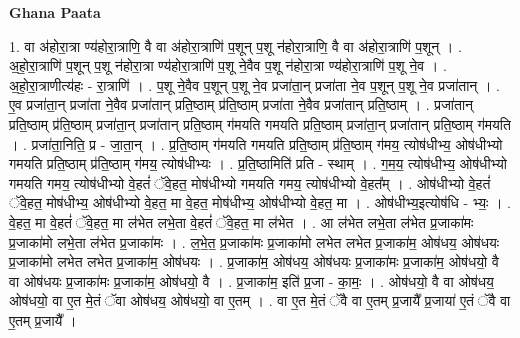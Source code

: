\documentclass[17pt]{extarticle}
\begin{document}
\textbf{Ghana Paata } \newline

1. वा अ॑होरा॒त्रा ण्य॑होरा॒त्राणि॒ वै वा अ॑होरा॒त्राणि॑ प॒शून् प॒शू न॑होरा॒त्राणि॒ वै वा अ॑होरा॒त्राणि॑ प॒शून् । . अ॒हो॒रा॒त्राणि॑ प॒शून् प॒शू न॑होरा॒त्रा ण्य॑होरा॒त्राणि॑ प॒शू ने॒वैव प॒शू न॑होरा॒त्रा ण्य॑होरा॒त्राणि॑ प॒शू ने॒व । . अ॒हो॒रा॒त्राणीत्य॑हः - रा॒त्राणि॑ । . प॒शू ने॒वैव प॒शून् प॒शू ने॒व प्रजा॑ता॒न् प्रजा॑ता ने॒व प॒शून् प॒शू ने॒व प्रजा॑तान् । . ए॒व प्रजा॑ता॒न् प्रजा॑ता ने॒वैव प्रजा॑तान् प्रति॒ष्ठाम् प्र॑ति॒ष्ठाम् प्रजा॑ता ने॒वैव प्रजा॑तान् प्रति॒ष्ठाम् । . प्रजा॑तान् प्रति॒ष्ठाम् प्र॑ति॒ष्ठाम् प्रजा॑ता॒न् प्रजा॑तान् प्रति॒ष्ठाम् ग॑मयति गमयति प्रति॒ष्ठाम् प्रजा॑ता॒न् प्रजा॑तान् प्रति॒ष्ठाम् ग॑मयति । . प्रजा॑ता॒निति॒ प्र - जा॒ता॒न् । . प्र॒ति॒ष्ठाम् ग॑मयति गमयति प्रति॒ष्ठाम् प्र॑ति॒ष्ठाम् ग॑मय॒ त्योष॑धीभ्य॒ ओष॑धीभ्यो गमयति प्रति॒ष्ठाम् प्र॑ति॒ष्ठाम् ग॑मय॒ त्योष॑धीभ्यः । . प्र॒ति॒ष्ठामिति॑ प्रति - स्थाम् । . ग॒म॒य॒ त्योष॑धीभ्य॒ ओष॑धीभ्यो गमयति गमय॒ त्योष॑धीभ्यो वे॒हतं॑ ॅवे॒हत॒ मोष॑धीभ्यो गमयति गमय॒ त्योष॑धीभ्यो वे॒हत᳚म् । . ओष॑धीभ्यो वे॒हतं॑ ॅवे॒हत॒ मोष॑धीभ्य॒ ओष॑धीभ्यो वे॒हत॒ मा वे॒हत॒ मोष॑धीभ्य॒ ओष॑धीभ्यो वे॒हत॒ मा । . ओष॑धीभ्य॒इत्योष॑धि - भ्यः॒ । . वे॒हत॒ मा वे॒हतं॑ ॅवे॒हत॒ मा ल॑भेत लभे॒ता वे॒हतं॑ ॅवे॒हत॒ मा ल॑भेत । . आ ल॑भेत लभे॒ता ल॑भेत प्र॒जाका॑मः प्र॒जाका॑मो लभे॒ता ल॑भेत प्र॒जाका॑मः । . ल॒भे॒त॒ प्र॒जाका॑मः प्र॒जाका॑मो लभेत लभेत प्र॒जाका॑म॒ ओष॑धय॒ ओष॑धयः प्र॒जाका॑मो लभेत लभेत प्र॒जाका॑म॒ ओष॑धयः । . प्र॒जाका॑म॒ ओष॑धय॒ ओष॑धयः प्र॒जाका॑मः प्र॒जाका॑म॒ ओष॑धयो॒ वै वा ओष॑धयः प्र॒जाका॑मः प्र॒जाका॑म॒ ओष॑धयो॒ वै । . प्र॒जाका॑म॒ इति॑ प्र॒जा - का॒मः॒ । . ओष॑धयो॒ वै वा ओष॑धय॒ ओष॑धयो॒ वा ए॒त मे॒तं ॅवा ओष॑धय॒ ओष॑धयो॒ वा ए॒तम् । . वा ए॒त मे॒तं ॅवै वा ए॒तम् प्र॒जायै᳚ प्र॒जाया॑ ए॒तं ॅवै वा ए॒तम् प्र॒जायै᳚ । \newline
\end{document}
